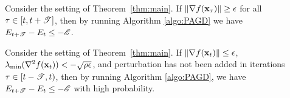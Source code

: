 


\begin{lemma}\label{lem:largeGrad}
Consider the setting of Theorem~\ref{thm:main}.
If $\left\|{\nabla f(\mathbf{x}_\tau)}\right\| \ge \epsilon$ for all $ \tau \in [t, t+\mathscr{T}]$, then by running Algorithm \ref{algo:PAGD} we have $E_{t+\mathscr{T}} - E_t \le -\mathscr{E}$.
\end{lemma}
\begin{lemma}\label{lem:negHess}
Consider the setting of Theorem~\ref{thm:main}. 
If $\left\|{\nabla f(\mathbf{x}_t)}\right\| \le \epsilon$, $\lambda_{\min} (\nabla^2 f(\mathbf{x}_t)) < -\sqrt{\rho\epsilon}$, 
and perturbation has not been added in iterations $\tau \in [t-\mathscr{T}, t)$, then by running Algorithm \ref{algo:PAGD}, we have $E_{t+\mathscr{T}} - E_t \le -\mathscr{E}$ with high probability.
\end{lemma}

